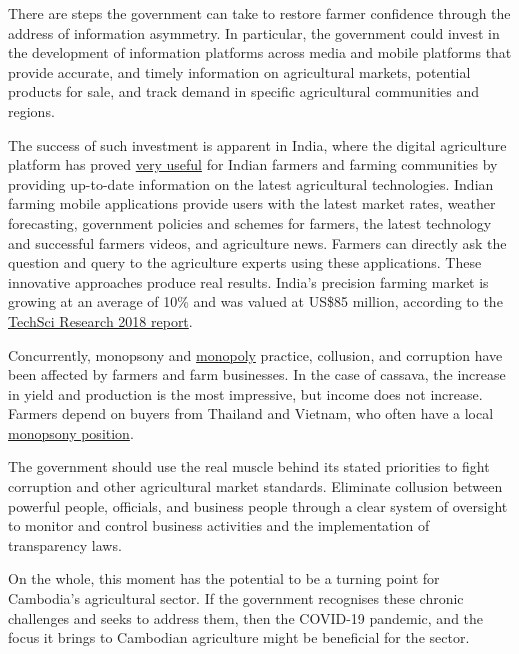 \documentclass[10pt,a4paper]{letter}
\begin{document}
There are steps the government can take to restore farmer confidence through the address of information asymmetry. In particular, the government could invest in the development of information platforms across media and mobile platforms that provide accurate, and timely information on agricultural markets, potential products for sale, and track demand in specific agricultural communities and regions.

The success of such investment is apparent in India, where the digital agriculture platform has proved \href{https://yourstory.com/mystory/e374fa4df7-top-5-best-android-app}{very useful} for Indian farmers and farming communities by providing up-to-date information on the latest agricultural technologies. Indian farming mobile applications provide users with the latest market rates, weather forecasting, government policies and schemes for farmers, the latest technology and successful farmers videos, and agriculture news. Farmers can directly ask the question and query to the agriculture experts using these applications. These innovative approaches produce real results. India's precision farming market is growing at an average of 10\% and was valued at US\$85 million, according to the \href{https://www.futurefarming.com/Smart-farmers/Articles/2020/4/Indian-agriculture-on-modernisation-track-since-2014-563584E/}{TechSci Research 2018 report}.

Concurrently, monopsony and \href{https://www.khmertimeskh.com/109451/government-acts-end-monopolies-abattoir-business/}{monopoly} practice, collusion, and corruption have been affected by farmers and farm businesses. In the case of cassava, the increase in yield and production is the most impressive, but income does not increase. Farmers depend on buyers from Thailand and Vietnam, who often have a local \href{https://www.ifad.org/documents/38714182/39973201/Cambodia+CSPE+final+draft.pdf/963662a4-168d-4822-a0b7-730d6c66ee46}{monopsony position}.

The government should use the real muscle behind its stated priorities to fight corruption and other agricultural market standards. Eliminate collusion between powerful people, officials, and business people through a clear system of oversight to monitor and control business activities and the implementation of transparency laws.

On the whole, this moment has the potential to be a turning point for Cambodia's agricultural sector. If the government recognises these chronic challenges and seeks to address them, then the COVID-19 pandemic, and the focus it brings to Cambodian agriculture might be beneficial for the sector.
\end{document}
